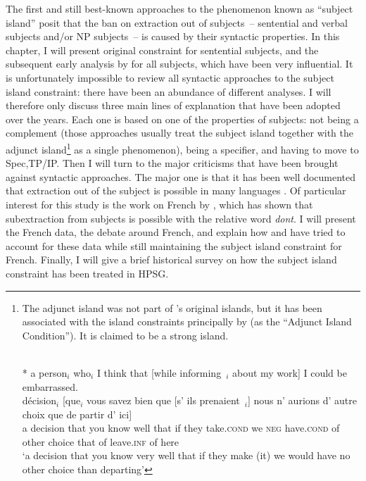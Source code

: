 \label{ch:syntax}

The first and still best-known approaches to the phenomenon known as ``subject island'' posit that the ban on extraction out of subjects~-- sentential and verbal subjects and/or NP subjects~-- is caused by their syntactic properties. In this chapter, I will present  original constraint for sentential subjects, and the subsequent early analysis by \citet{Chomsky.1973} for all subjects, which have been very influential. It is unfortunately impossible to review all syntactic approaches to the subject island constraint: there have been an abundance of different analyses. I will therefore only discuss three main lines of explanation that have been adopted over the years. Each one is based on one of the properties of subjects: not being a complement (those approaches usually treat the subject island together with the adjunct island\footnote{The adjunct island was not part of \citeauthor{Ross.1967}'s original islands, but it has been associated with the island constraints principally by \citet{Cattell.1976} (as the ``Adjunct Island Condition''). It is claimed to be a strong island. 

\eal 
\ex \citep[168]{Longobardi.1985}\\
* a person$_i$ who$_i$ I think that [while informing~\trace{}$_i$ about my work] I could be embarrassed.
\label{longobardi-adjunct-island}
\ex \citep[43]{Godard.1988}\\
\gll * [une] décision$_i$ [que$_i$ vous savez bien que [s' ils prenaient~\trace{}$_i$] nous n' aurions d' autre choix que de partir d' ici]\\
{} \sbar{}a decision \sbar{}that you know well that \sbar{}if they take\textsc{.cond} we \textsc{neg} have\textsc{.cond} of other choice that of leave\textsc{.inf} of here\\ 
\glt `a decision that you know very well that if they make (it) we would have no other choice than departing'
\zl} as a single phenomenon), being a specifier, and having to move to Spec,TP/IP. Then I will turn to the major criticisms that have been brought against syntactic approaches. The major one is that it has been well documented that extraction out of the subject is possible in many languages \citep{Stepanov.2007}. Of particular interest for this study is the work on French by \citet{Godard.1988}, which has shown that subextraction from subjects is possible with the relative word \emph{dont}. I will present the French data, the debate around French, and explain how \citet{Tellier.1990,Tellier.1991} and \citet{Heck.2009} have tried to account for these data while still maintaining the subject island constraint for French. Finally, I will give a brief historical survey on how the subject island constraint has been treated in HPSG. 

